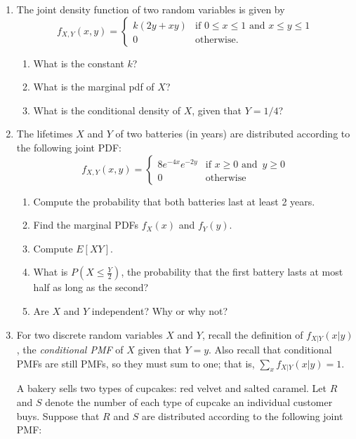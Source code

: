 \documentclass{article}    %
\begin{document}
	\begin{enumerate}
		\item  The joint density function of two random variables is given by
		$$
		f_{X,Y}(x,y) = 
		\begin{cases}
		k(2y+xy) & \text{if } 0 \le x \le 1\text{ and } x \le y \le 1 \\
		0 & \text{otherwise.}
		\end{cases}
		$$
		\begin{enumerate}
			\item What is the constant $k$?
			\item What is the marginal pdf of $X$?
			\item What is the conditional density of $X$, given that $Y = 1/4$?
		\end{enumerate}
		
		\item  The lifetimes $X$ and $Y$ of two batteries (in years) are distributed according to the following joint PDF:
		$$
		f_{X,Y}(x,y) = 
		\begin{cases} 
		8e^{-4x}e^{-2y} & \text{if }x\geq 0 \text{ and } \, y \geq 0 \\ 
		0 & \text{otherwise}
		\end{cases}
		$$
		\begin{enumerate}
			\item Compute the probability that both batteries last at least 2 years.
			
			\item  Find the marginal PDFs $f_X(x)$ and $f_Y(y)$.
			
			\item Compute $E[XY]$.
			
			\item What is $P(X \le \frac{Y}{2})$, the probability that the first battery lasts at most half as long as the second?
			
			\item Are $X$ and $Y$ independent? Why or why not?
		\end{enumerate}
		
		\item For two discrete random variables  $X$ and $Y$, recall the definition of $ f_{X|Y}(x|y) $, the \textit{conditional PMF} of $X$ given that $Y=y$.
		Also recall that conditional PMFs are still PMFs, so they must sum to one; that is,
		$
		\sum_{x} f_{X|Y}(x|y) = 1.
		$
		
		A bakery sells two types of cupcakes:
		red velvet and salted caramel. Let $R$ and $S$ denote the
		number of each type of cupcake an individual customer
		buys. Suppose that $R$ and $S$ are distributed according to
		the following joint PMF:
		

\end{enumerate}
\end{document}
